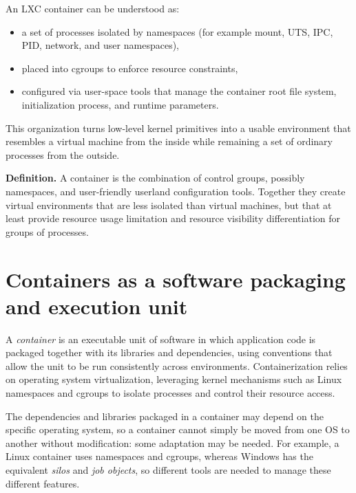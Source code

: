 An LXC container can be understood as:

\begin{itemize}
\item a set of processes isolated by namespaces (for example mount, UTS, IPC, PID, network, and user namespaces),
\item placed into cgroups to enforce resource constraints,
\item configured via user-space tools that manage the container root file system, initialization process, and runtime parameters.
\end{itemize}

This organization turns low-level kernel primitives into a usable environment that resembles a virtual machine from the inside while remaining a set of ordinary processes from the outside.

\begin{center}
\end{center}

\begin{notebox}
	\textbf{Definition.} A container is the combination of control groups, possibly namespaces, and user-friendly userland configuration tools. Together they create virtual environments that are less isolated than virtual machines, but that at least provide resource usage limitation and resource visibility differentiation for groups of processes.
\end{notebox}

\section{Containers as a software packaging and execution unit}

A \emph{container} is an executable unit of software in which application code is packaged together with its libraries and dependencies, using conventions that allow the unit to be run consistently across environments. Containerization relies on operating system virtualization, leveraging kernel mechanisms such as Linux namespaces and cgroups to isolate processes and control their resource access.

The dependencies and libraries packaged in a container may depend on the specific operating system, so a container cannot simply be moved from one OS to another without modification: some adaptation may be needed. For example, a Linux container uses namespaces and cgroups, whereas Windows has the equivalent \emph{silos} and \emph{job objects}, so different tools are needed to manage these different features.

